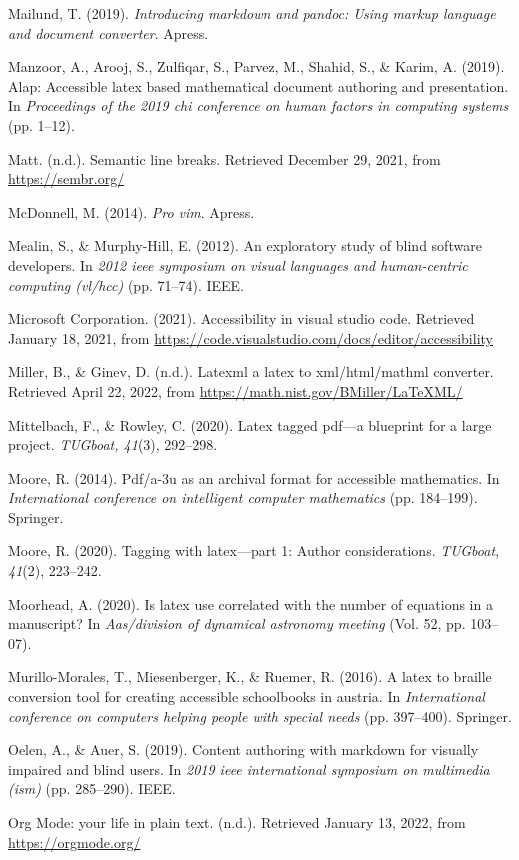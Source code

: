 \documentclass[11pt]{sig-alternate}
\begin{document}
\begin{large}
Mailund, T. (2019). \textit{Introducing markdown and pandoc: Using markup language and document converter}. Apress.

Manzoor, A., Arooj, S., Zulfiqar, S., Parvez, M., Shahid, S., \& Karim, A. (2019). Alap: Accessible latex based mathematical document authoring and presentation. In\textit{ Proceedings of the 2019 chi conference on human factors in computing systems }(pp. 1–12).

Matt. (n.d.). Semantic line breaks. Retrieved December 29, 2021, from \url{https://sembr.org/}

McDonnell, M. (2014). \textit{Pro vim}. Apress.

Mealin, S., \& Murphy-Hill, E. (2012). An exploratory study of blind software developers. In \textit{2012 ieee symposium on visual languages and human-centric computing (vl/hcc)} (pp. 71–74). IEEE. 

Microsoft Corporation. (2021). Accessibility in visual studio code. Retrieved January 18, 2021, from \url{https://code.visualstudio.com/docs/editor/accessibility}

Miller, B., \& Ginev, D. (n.d.). Latexml a latex to xml/html/mathml converter. Retrieved April 22, 2022, from \url{https://math.nist.gov/BMiller/LaTeXML/}

Mittelbach, F., \& Rowley, C. (2020). Latex tagged pdf—a blueprint for a large project. \textit{TUGboat, 41}(3), 292–298.

Moore, R. (2014). Pdf/a-3u as an archival format for accessible mathematics. In\textit{ International conference on intelligent computer mathematics }(pp. 184–199). Springer.

Moore, R. (2020). Tagging with latex—part 1: Author considerations.\textit{ TUGboat, 41}(2), 223–242.

Moorhead, A. (2020). Is latex use correlated with the number of equations in a manuscript? In \textit{Aas/division of dynamical astronomy meeting} (Vol. 52, pp. 103–07).

Murillo-Morales, T., Miesenberger, K., \& Ruemer, R. (2016). A latex to braille conversion tool for creating accessible schoolbooks in austria. In \textit{International conference on computers helping people with special needs }(pp. 397–400). Springer.

Oelen, A., \& Auer, S. (2019). Content authoring with markdown for visually impaired and blind users. In \textit{2019 ieee international symposium on multimedia (ism) }(pp. 285–290). IEEE.

Org Mode: your life in plain text. (n.d.). Retrieved January 13, 2022, from \url{https://orgmode.org/}


\end{large}
\end{document}
